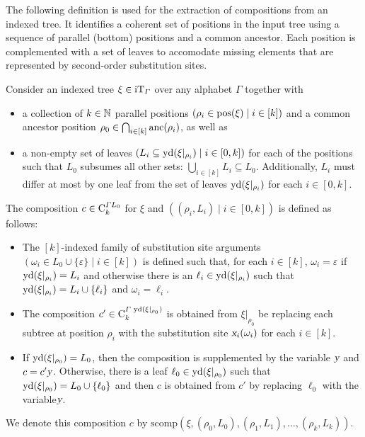 \documentclass[../../document.tex]{subfiles}
\begin{document}
    The following definition is used for the extraction of  compositions from an indexed tree.
    It identifies a coherent set of positions in the input tree using a sequence of parallel (bottom) positions and a common ancestor.
    Each position is complemented with a set of leaves to accomodate missing elements that are represented by second-order substitution sites.

    \begin{definition}\label{def:dcp:comp}
        Consider an indexed tree \(\xi \in \operatorname{iT}_{\varGamma}\) over any alphabet \(\varGamma\) together with
        \begin{itemize}
            \item
                a collection of \(k \in \mathbb{N}\) parallel positions \((\rho_i \in \operatorname{pos}(\xi) \mid i \in [k])\) and
                a common ancestor position \(\rho_0 \in \bigcap_{i \in [k]} \operatorname{anc}(\rho_i)\), as well as
            \item
                a non-empty set of leaves \((L_i \subseteq \operatorname{yd}(\xi|_{\rho_i}) \mid i \in [0, k])\) for each of the positions such that
                \(L_0\) subsumes all other sets: \(\bigcup_{i\in[k]} L_i \subseteq L_0\). Additionally, \(L_i\) must differ at most by one leaf from the set of leaves \(\operatorname{yd}(\xi|_{\rho_i})\) for each \(i \in [0,k]\).
        \end{itemize}

        The  composition \(c \in \mathrm{C}^{\varGamma L_0}_k\) for \(\xi\) and \(((\rho_i, L_i) \mid i \in [0,k])\) is defined as follows:
        \begin{itemize}
            \item
                The \([k]\)-indexed family of substitution site arguments \((\omega_i \in L_0 \cup \{\varepsilon\} \mid i \in [k])\) is defined such that, for each \(i\in[k]\), \(\omega_i = \varepsilon\) if \(\operatorname{yd}(\xi|_{\rho_i}) = L_i\) and otherwise there is an \(\ell_i \in \operatorname{yd}(\xi|_{\rho_i})\) such that \(\operatorname{yd}(\xi|_{\rho_i}) = L_i \cup \{\ell_i\}\) and \(\omega_i = \ell_i\).
            \item
                The composition \(c' \in \mathrm{C}^{\varGamma\,\operatorname{yd}(\xi|_{\rho_0})}_k\) is obtained from \(\xi|_{\rho_0}\) be replacing each subtree at position \(\rho_i\) with the substitution site \(\textsl{x}_i(\omega_i)\) for each \(i \in [k]\).
            \item
                If \(\operatorname{yd}(\xi|_{\rho_0}) = L_0\), then the composition is supplemented by the variable \(\textsl{y}\) and \(c=c' \textsl{y}\).
                Otherwise, there is a leaf \(\ell_0 \in \operatorname{yd}(\xi|_{\rho_0})\) such that \(\operatorname{yd}(\xi|_{\rho_0}) = L_0 \cup \{\ell_0\}\) and then \(c\) is obtained from \(c'\) by replacing \(\ell_0\) with the variable\(\textsl{y}\).
        \end{itemize}
        We denote this composition \(c\) by \(\mathrm{scomp}(\xi, (\rho_0, L_0), (\rho_1, L_1), \ldots, (\rho_k, L_k))\).
    \end{definition}
\end{document}
